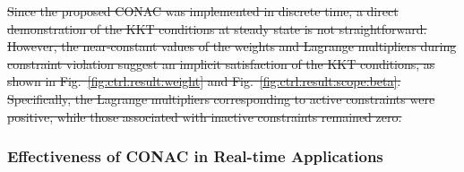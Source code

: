 \documentclass[letterpaper, journal]{IEEEtran}
\newcommand{\ctxt}[2]{\color{#1}#2\color{black}}
\providecommand{\DIFdel}[1]{{\protect\color{red}\sout{#1}}} %
\providecommand{\DIFdelbegin}{} %
\providecommand{\DIFdelend}{} %
\begin{document}
\DIFdelbegin \DIFdel{Since the proposed CONAC was implemented in discrete time, a direct demonstration of the KKT conditions at steady state is not straightforward. 
However, the near-constant values of the weights and Lagrange multipliers during constraint violation suggest an implicit satisfaction of the KKT conditions, as shown in Fig.~\ref{fig:ctrl:result:weight} and Fig.~\ref{fig:ctrl:result:scope:beta}.
Specifically, the Lagrange multipliers corresponding to active constraints were positive, while those associated with inactive constraints remained zero.
}\DIFdelend %

\DIFdelbegin %

\DIFdelend %
\hfill

\subsubsection{Effectiveness of CONAC in Real-time Applications}
\end{document}
